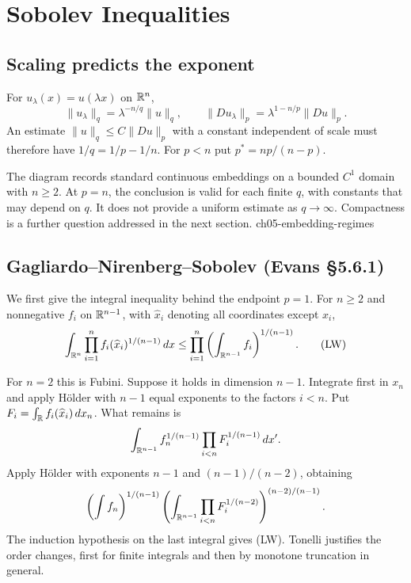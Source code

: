 \section{Sobolev Inequalities}
\label{sec:5-6}

\subsection{Scaling predicts the exponent}
For $u_\lambda(x)=u(\lambda x)$ on $\mathbb{R}^n$,
\[
 \|u_\lambda\|_q=\lambda^{-n/q}\|u\|_q,\qquad
 \|Du_\lambda\|_p=\lambda^{1-n/p}\|Du\|_p.
\]
An estimate $\|u\|_q\leq C\|Du\|_p$ with a constant independent of scale
must therefore have $1/q=1/p-1/n$. For $p<n$ put $p^*=np/(n-p)$.
\Needspace{45mm}


{The diagram records standard continuous embeddings on a bounded $C^1$ domain with $n\geq2$. At $p=n$, the conclusion is valid for each finite $q$, with constants that may depend on $q$. It does not provide a uniform estimate as $q\to\infty$. Compactness is a further question addressed in the next section.}
{ch05-embedding-regimes}

\subsection{Gagliardo--Nirenberg--Sobolev (Evans \S5.6.1)}
We first give the integral inequality behind the endpoint $p=1$.
For $n\geq2$ and nonnegative $f_i$ on $\mathbb{R}^{n-1}$, with
$\widehat x_i$ denoting all coordinates except $x_i$,
\[
 \int_{\mathbb{R}^n}\prod_{i=1}^n f_i(\widehat x_i)^{1/(n-1)}\,dx
 \leq\prod_{i=1}^n\left(\int_{\mathbb{R}^{n-1}}f_i\right)^{1/(n-1)}.
 \tag{LW}
\]
\begin{expandedproof}
For $n=2$ this is Fubini. Suppose it holds in dimension $n-1$.
Integrate first in $x_n$ and apply H\"older with $n-1$ equal exponents
to the factors $i<n$. Put
$F_i=\int_{\mathbb{R}} f_i(\widehat x_i)\,dx_n$. What remains is
\[
 \int_{\mathbb{R}^{n-1}}f_n^{1/(n-1)}
              \prod_{i<n}F_i^{1/(n-1)}\,dx'.
\]
Apply H\"older with exponents $n-1$ and $(n-1)/(n-2)$, obtaining
\[
 \left(\int f_n\right)^{1/(n-1)}
 \left(\int_{\mathbb{R}^{n-1}}\prod_{i<n}F_i^{1/(n-2)}
 \right)^{(n-2)/(n-1)}.
\]
The induction hypothesis on the last integral gives (LW).
Tonelli justifies the order changes, first for finite integrals and
then by monotone truncation in general.
\end{expandedproof}

